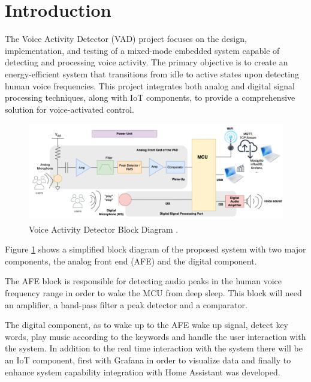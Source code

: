\section{Introduction}

The Voice Activity Detector (VAD) project focuses on the design, implementation, and testing of a mixed-mode embedded system capable of detecting and processing voice activity. The primary objective is to create an energy-efficient system that transitions from idle to active states upon detecting human voice frequencies. This project integrates both analog and digital signal processing techniques, along with IoT components, to provide a comprehensive solution for voice-activated control.

\begin{figure}[H]
    \centering
    \includegraphics*[scale = 0.3]{Images/VADBlockDiagram.png}
    \caption{Voice Activity Detector Block Diagram \textsuperscript{\cite{Lab-statement}} .}
    \label{fig:VADBlockDiagram}
\end{figure}

Figure \ref{fig:VADBlockDiagram} shows a simplified block diagram of the proposed system with two major components, the analog front end (AFE) and the digital component.

The AFE block is responsible for detecting audio peaks in the human voice frequency range in order to wake the MCU from deep sleep. This block will need an amplifier, a band-pass filter a peak detector and a comparator. 

The digital component, as to wake up to the AFE wake up signal, detect key words, play music according to the keywords and handle the user interaction with the system. In addition to the real time interaction with the system there will be an IoT component, first with Grafana in order to visualize data and finally to enhance system capability integration with Home Assistant was developed.